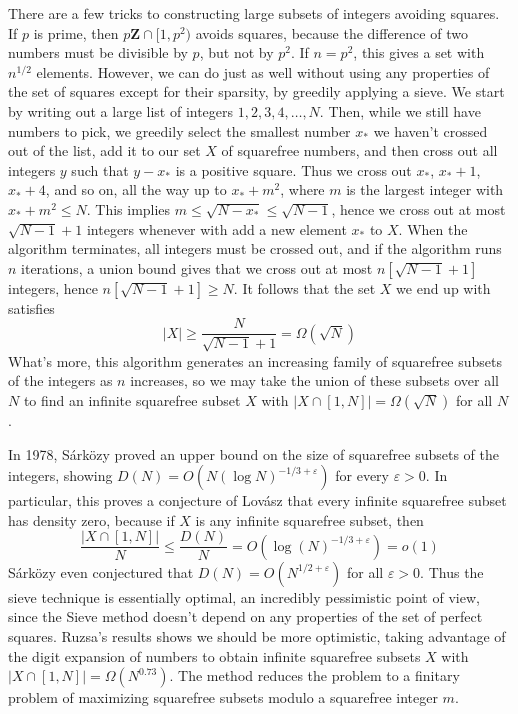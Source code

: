 \documentclass{report}
\theoremstyle{plain}
\theoremstyle{plain}
\begin{document}
There are a few tricks to constructing large subsets of integers avoiding squares. If $p$ is prime, then $p \mathbf{Z} \cap [1,p^2)$ avoids squares, because the difference of two numbers must be divisible by $p$, but not by $p^2$. If $n = p^2$, this gives a set with $n^{1/2}$ elements. However, we can do just as well without using any properties of the set of squares except for their sparsity, by greedily applying a sieve. We start by writing out a large list of integers $1,2,3,4,\dots,N$. Then, while we still have numbers to pick, we greedily select the smallest number $x_*$ we haven't crossed out of the list, add it to our set $X$ of squarefree numbers, and then cross out all integers $y$ such that $y - x_*$ is a positive square. Thus we cross out $x_*$, $x_* + 1$, $x_* + 4$, and so on, all the way up to $x_* + m^2$, where $m$ is the largest integer with $x_* + m^2 \leq N$. This implies $m \leq \sqrt{N - x_*} \leq \sqrt{N-1}$, hence we cross out at most $\sqrt{N-1} + 1$ integers whenever with add a new element $x_*$ to $X$. When the algorithm terminates, all integers must be crossed out, and if the algorithm runs $n$ iterations, a union bound gives that we cross out at most $n[\sqrt{N-1} + 1]$ integers, hence $n[\sqrt{N-1} + 1] \geq N$. It follows that the set $X$ we end up with satisfies
%
\[ |X| \geq \frac{N}{\sqrt{N-1} + 1} = \Omega \left( \sqrt{N} \right) \]
%
What's more, this algorithm generates an increasing family of squarefree subsets of the integers as $n$ increases, so we may take the union of these subsets over all $N$ to find an infinite squarefree subset $X$ with $|X \cap [1,N]| = \Omega(\sqrt{N})$ for all $N$.

In 1978, S\'{a}rk\"{o}zy proved an upper bound on the size of squarefree subsets of the integers, showing $D(N) = O(N (\log N)^{-1/3 + \varepsilon})$ for every $\varepsilon > 0$. In particular, this proves a conjecture of Lov\'{a}sz that every infinite squarefree subset has density zero, because if $X$ is any infinite squarefree subset, then
%
\[ \frac{|X \cap [1,N]|}{N} \leq \frac{D(N)}{N} = O(\log(N)^{-1/3 + \varepsilon}) = o(1) \]
%
S\'{a}rk\"{o}zy even conjectured that $D(N) = O(N^{1/2 + \varepsilon})$ for all $\varepsilon > 0$. Thus the sieve technique is essentially optimal, an incredibly pessimistic point of view, since the Sieve method doesn't depend on any properties of the set of perfect squares. Ruzsa's results shows we should be more optimistic, taking advantage of the digit expansion of numbers to obtain infinite squarefree subsets $X$ with $|X \cap [1,N]| = \Omega(N^{0.73})$. The method reduces the problem to a finitary problem of maximizing squarefree subsets modulo a squarefree integer $m$.
\end{document}
